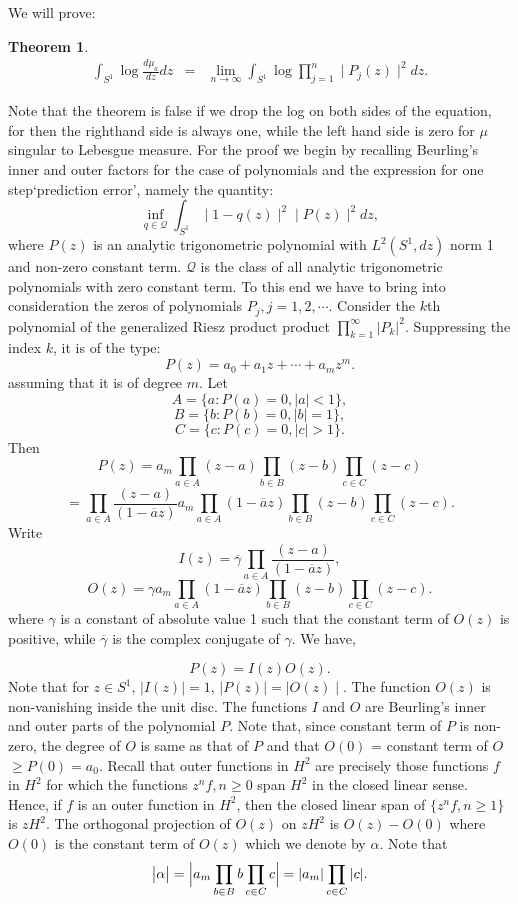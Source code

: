 \documentclass{amsart}
\newtheorem{Th}{Theorem}[section]
\theoremstyle{definition}
\theoremstyle{remark}
\numberwithin{equation}{section}
\newcommand{\1}{\mathbb{1}}
\begin{document}
\noindent{}We will prove:
\begin{Th}\label{th5}
\begin{eqnarray*}
\int_{S^1}\log\frac{d\mu_a}{dz}dz &=&\lim_{n\rightarrow \infty}\int_{S^1}\log \prod_{j=1}^n \mid P_j(z)\mid^2dz.
\end{eqnarray*}
\end{Th}
 Note that the theorem is false if we drop the log on both sides of the equation, for then the righthand side is always one, while the left hand side is zero for $\mu$ singular to Lebesgue measure. For the proof we begin by recalling Beurling's inner and outer factors for the case of polynomials and the expression for one step`prediction error', namely the quantity:
$$\inf_{q \in\mathcal Q}\int_{S^1}\mid 1 - q(z)\mid^2 \mid P(z)\mid^2dz,$$ where $P(z)$ is an analytic trigonometric polynomial with $L^2(S^1,dz)$ norm 1 and non-zero constant term.  $\mathcal Q$ is the class of all analytic trigonometric polynomials with zero constant term. To this end we have to bring into consideration the zeros of polynomials $P_j, j=1,2,\cdots$. Consider the $k$th polynomial of the generalized Riesz product product $ \prod_{k=1}^\infty|P_k|^2$. Suppressing the index $k$, it is of the type:
     $$P(z) = a_0 + a_1 z + \cdots + a_{m}z^{m}.$$
assuming that it is of degree $m$.
     Let $$A = \{a: P(a) = 0, \mid a\mid < 1\},$$
     $$B = \{b: P(b) = 0, \mid b\mid = 1\},$$
     $$C = \{c: P(c) = 0, \mid c\mid > 1\}.$$
  Then
  $$P(z) = a_{m} \prod_{a\in A}(z - a)\prod _{b\in B}(z-b) \prod_{c\in C}(z-c)$$
  $$=\prod_{a\in A}\frac{(z -a)}{(1-\overline a z)} a_{m}\prod_{a\in A}(1 - \overline a z) \prod_{b\in B}(z-b)\prod_{c\in C}(z-c).$$
  Write $$I(z) =\overline{\gamma} \prod_{a\in A}\frac{(z -a)}{(1-\overline a z)},$$
  $$O(z) = \gamma a_{m}\prod_{a\in A}(1 - \overline a z) \prod_{b\in B}(z-b)\prod_{c\in C}(z-c).$$
  where $\gamma$ is a constant of absolute value 1 such that the  constant term of $O(z)$ is positive, while $\overline {\gamma}$ is the complex conjugate of $\gamma$.
  We have,

  $$P(z) =  I(z) O(z).$$
  Note that for  $ z\in S^1$, $\mid I(z)\mid =1$, $ \mid P(z)\mid = \mid O(z)\mid $. The function $O(z)$ is non-vanishing inside the unit disc. The functions $I$ and $O$ are Beurling's inner and outer parts of the polynomial $P$. Note that, since constant term of $P$ is non-zero, the  degree of $O$  is same as that of $P$ and that $O(0)$ = constant term of $O$ $\geq P(0) = a_0$. Recall that  outer functions in $H^2$ are precisely those functions $f$ in $H^2$ for which the functions $z^n f, n \geq 0$ span $H^2$ in the closed linear sense. Hence, if $f$ is an outer function in $H^2$, then the closed linear span of $\{z^nf,n\geq 1\}$  is $ zH^2$. The orthogonal projection of $O(z)$ on $zH^2$ is $O(z) - O(0)$ where  $O(0)$ is the constant term of $O(z)$ which we denote by $\alpha$. Note that
   $$\bigl| \alpha \bigr|= \Bigl| a_{m}\prod_{b\in B}b\prod_{c\in C}c\Bigr|=|a_m|\prod_{c\in C}|c|.$$
\end{document}
